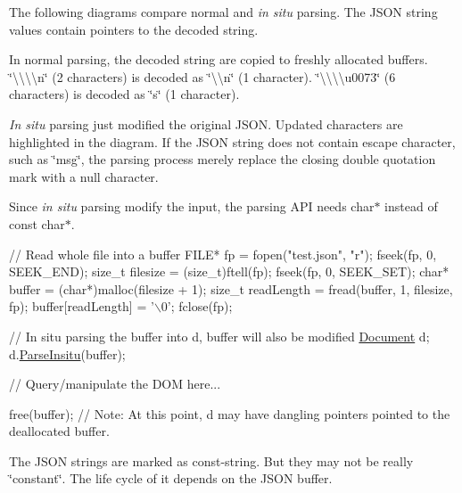 The following diagrams compare normal and {\itshape in situ} parsing. The J\+S\+ON string values contain pointers to the decoded string.



In normal parsing, the decoded string are copied to freshly allocated buffers. {\ttfamily \char`\"{}\textbackslash{}\textbackslash{}\textbackslash{}\textbackslash{}n\char`\"{}} (2 characters) is decoded as {\ttfamily \char`\"{}\textbackslash{}\textbackslash{}n\char`\"{}} (1 character). {\ttfamily \char`\"{}\textbackslash{}\textbackslash{}\textbackslash{}\textbackslash{}u0073\char`\"{}} (6 characters) is decoded as {\ttfamily \char`\"{}s\char`\"{}} (1 character).



{\itshape In situ} parsing just modified the original J\+S\+ON. Updated characters are highlighted in the diagram. If the J\+S\+ON string does not contain escape character, such as {\ttfamily \char`\"{}msg\char`\"{}}, the parsing process merely replace the closing double quotation mark with a null character.

Since {\itshape in situ} parsing modify the input, the parsing A\+PI needs {\ttfamily char$\ast$} instead of {\ttfamily const char$\ast$}.


\begin{DoxyCode}
\textcolor{comment}{// Read whole file into a buffer}
FILE* fp = fopen(\textcolor{stringliteral}{"test.json"}, \textcolor{stringliteral}{"r"});
fseek(fp, 0, SEEK\_END);
\textcolor{keywordtype}{size\_t} filesize = (size\_t)ftell(fp);
fseek(fp, 0, SEEK\_SET);
\textcolor{keywordtype}{char}* buffer = (\textcolor{keywordtype}{char}*)malloc(filesize + 1);
\textcolor{keywordtype}{size\_t} readLength = fread(buffer, 1, filesize, fp);
buffer[readLength] = \textcolor{charliteral}{'\(\backslash\)0'};
fclose(fp);

\textcolor{comment}{// In situ parsing the buffer into d, buffer will also be modified}
\hyperlink{class_generic_document}{Document} d;
d.\hyperlink{class_generic_document_a301f8f297a5a0da4b6be5459ad766f75}{ParseInsitu}(buffer);

\textcolor{comment}{// Query/manipulate the DOM here...}

free(buffer);
\textcolor{comment}{// Note: At this point, d may have dangling pointers pointed to the deallocated buffer.}
\end{DoxyCode}


The J\+S\+ON strings are marked as const-\/string. But they may not be really \char`\"{}constant\char`\"{}. The life cycle of it depends on the J\+S\+ON buffer.

